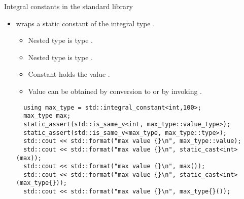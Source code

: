 \begin{frame}[t,fragile]{Integral constants in the standard library}
\begin{itemize}
  \item {} wraps a static constant of the integral type .
    \begin{itemize}
      \item Nested type  is type .
      \item Nested type  is type .
      \item Constant  holds the value .
      \item Value can be obtained by conversion to  or by invoking .
    \end{itemize}

\begin{lstlisting}
  using max_type = std::integral_constant<int,100>; 
  max_type max;
  static_assert(std::is_same_v<int, max_type::value_type>);
  static_assert(std::is_same_v<max_type, max_type::type>);
  std::cout << std::format("max value {}\n", max_type::value);
  std::cout << std::format("max value {}\n", static_cast<int>(max));
  std::cout << std::format("max value {}\n", max());
  std::cout << std::format("max value {}\n", static_cast<int>(max_type{}));
  std::cout << std::format("max value {}\n", max_type{}());
\end{lstlisting}

\end{itemize}
\end{frame}

